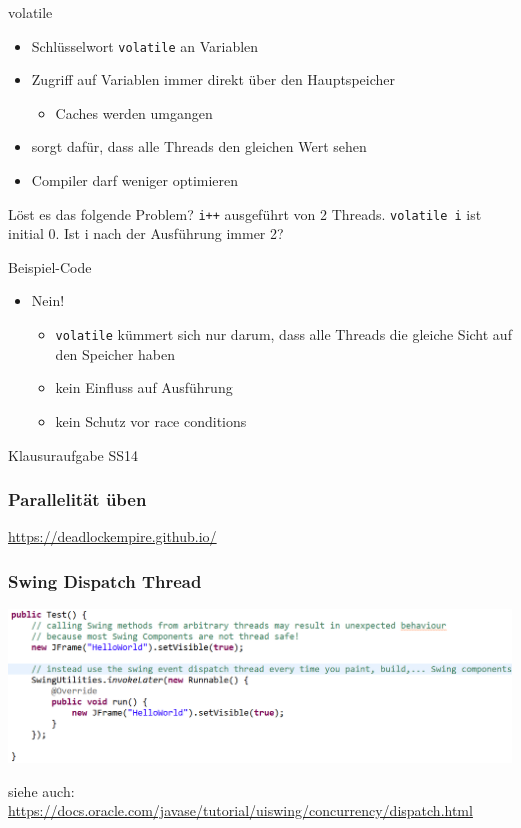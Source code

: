 \documentclass[18pt]{beamer}
\begin{document}
	\begin{frame}{volatile}
		\begin{itemize}
			\item Schlüsselwort \texttt{volatile} an Variablen
			\item Zugriff auf Variablen immer direkt über den Hauptspeicher
			\begin{itemize}
				\item Caches werden umgangen
			\end{itemize}
			\item sorgt dafür, dass alle Threads den gleichen Wert sehen \pause
			\item Compiler darf weniger optimieren
		\end{itemize} \pause
		\begin{exampleblock}{Löst es das folgende Problem?}
			\texttt{i++} ausgeführt von 2 Threads. \texttt{volatile i} ist initial 0. \linebreak Ist i nach der Ausführung immer 2?
		\end{exampleblock} \pause Beispiel-Code \pause
		\begin{itemize}
			\item Nein! 
			\begin{itemize}
				\item \texttt{volatile} kümmert sich nur darum, dass alle Threads die gleiche Sicht auf den Speicher haben
				\item kein Einfluss auf Ausführung
				\item kein Schutz vor race conditions
			\end{itemize}
		\end{itemize}
	\end{frame}
	
	\begin{frame}
		\centering
		\begin{huge}
			Klausuraufgabe SS14
		\end{huge}
	\end{frame}
	
	\begin{frame}
		\frametitle{Parallelität üben}
		\centering \huge \url{https://deadlockempire.github.io/}
	\end{frame}
	
	
	\begin{frame}
		\frametitle{Swing Dispatch Thread}
		\includegraphics[scale=0.35]{./pics/tut5/edt.png}
		\begin{tiny}
			siehe auch: \url{https://docs.oracle.com/javase/tutorial/uiswing/concurrency/dispatch.html}
		\end{tiny}
	\end{frame}
\end{document}
